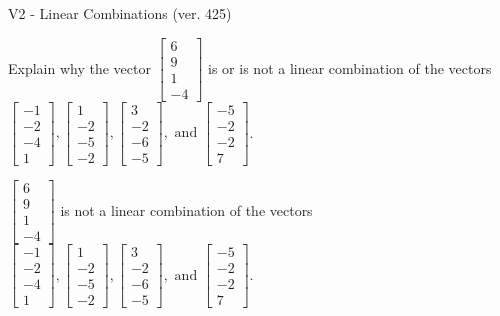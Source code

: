 \begin{exercise}
  \begin{exerciseTitle}V2 - Linear Combinations (ver. 425)\end{exerciseTitle}
  \begin{exerciseStatement}
    Explain why the vector \(\left[\begin{array}{c}
6 \\
9 \\
1 \\
-4
\end{array}\right]\)  is or is not a linear 
	combination of the vectors \(\left[\begin{array}{c}
-1 \\
-2 \\
-4 \\
1
\end{array}\right] , \left[\begin{array}{c}
1 \\
-2 \\
-5 \\
-2
\end{array}\right] , \left[\begin{array}{c}
3 \\
-2 \\
-6 \\
-5
\end{array}\right] , \text{ and } \left[\begin{array}{c}
-5 \\
-2 \\
-2 \\
7
\end{array}\right]\).
	


  \end{exerciseStatement}
  \begin{exerciseAnswer}
   \(\left[\begin{array}{c}
6 \\
9 \\
1 \\
-4
\end{array}\right]\) 
  	 is not  
	a linear combination of the vectors \(\left[\begin{array}{c}
-1 \\
-2 \\
-4 \\
1
\end{array}\right] , \left[\begin{array}{c}
1 \\
-2 \\
-5 \\
-2
\end{array}\right] , \left[\begin{array}{c}
3 \\
-2 \\
-6 \\
-5
\end{array}\right] , \text{ and } \left[\begin{array}{c}
-5 \\
-2 \\
-2 \\
7
\end{array}\right]\).


\end{exerciseAnswer}
\end{exercise}

